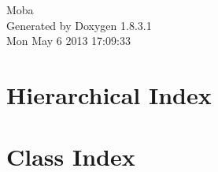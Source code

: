 \documentclass{book}
\begin{document}
\hypersetup{pageanchor=false,citecolor=blue}
\begin{titlepage}
\vspace*{7cm}
\begin{center}
{\Large Moba }\\
\vspace*{1cm}
{\large Generated by Doxygen 1.8.3.1}\\
\vspace*{0.5cm}
{\small Mon May 6 2013 17:09:33}\\
\end{center}
\end{titlepage}
\clearemptydoublepage
{}
\tableofcontents
\clearemptydoublepage
{}
\hypersetup{pageanchor=true,citecolor=blue}
\chapter{Hierarchical Index}

\chapter{Class Index}

\end{document}
